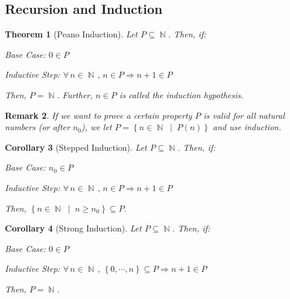 \documentclass[12pt]{article}
\let\RA\Rightarrow
\newcommand{\set}[2]{\left\{{#1}\;\middle|\;{#2}\right\}}
\newcommand{\Forall}[1]{\forall\,{#1}\,,\,}
\newcommand{\seq}[2][0]{\left\{{#1},\cdots,{#2}\right\}}
\DeclareMathOperator{\N}{\mathbb{N}}
\newtheorem{theorem}{Theorem}[subsection]
\newtheorem{corollary}[theorem]{Corollary}
\newtheorem{remark}[theorem]{Remark}
\begin{document}
\pagebreak

\subsection{Recursion and Induction}

\begin{theorem}[Peano Induction]
  Let $P\subseteq \N$. Then, if:
  \begin{compactitem}
    \item Base Case: $0\in P$
    \item Inductive Step: $\Forall{n\in\N} n\in P \RA n+1\in P$
  \end{compactitem}
  Then, $P=\N$. Further, $n\in P$ is called the induction hypothesis.
\end{theorem}

\begin{remark}
  If we want to prove a certain property $P$ is valid for all natural numbers (or after $n_0$), we let $P=\set{n\in\N}{P(n)}$ and use induction.
\end{remark}

\begin{corollary}[Stepped Induction]
  Let $P\subseteq \N$. Then, if:
  \begin{compactitem}
    \item Base Case: $n_0\in P$
    \item Inductive Step: $\Forall{n\in\N} n\in P \RA n+1\in P$
  \end{compactitem}
  Then, $\set{n\in\N}{n\geq n_0}\subseteq P$.
\end{corollary}

\begin{corollary}[Strong Induction]
  Let $P\subseteq \N$. Then, if:
  \begin{compactitem}
    \item Base Case: $0\in P$
    \item Inductive Step: $\Forall{n\in\N} \seq{n}\subseteq P \RA n+1\in P$
  \end{compactitem}
  Then, $P=\N$.
\end{corollary}
\end{document}
